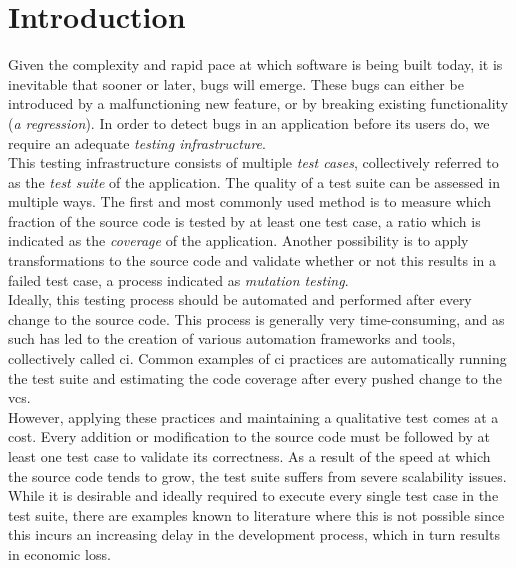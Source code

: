 
\chapter{Introduction}
\label{ch:introduction}
Given the complexity and rapid pace at which software is being built today, it is inevitable that sooner or later, bugs will emerge. These bugs can either be introduced by a malfunctioning new feature, or by breaking existing functionality (\emph{a regression}). In order to detect bugs in an application before its users do, we require an adequate \emph{testing infrastructure}.\\

\noindent This testing infrastructure consists of multiple \emph{test cases}, collectively referred to as the \emph{test suite} of the application. The quality of a test suite can be assessed in multiple ways. The first and most commonly used method is to measure which fraction of the source code is tested by at least one test case, a ratio which is indicated as the \emph{coverage} of the application. Another possibility is to apply transformations to the source code and validate whether or not this results in a failed test case, a process indicated as \emph{mutation testing}.\\

\noindent Ideally, this testing process should be automated and performed after every change to the source code. This process is generally very time-consuming, and as such has led to the creation of various automation frameworks and tools, collectively called \acrfull{ci}. Common examples of \acrshort{ci} practices are automatically running the test suite and estimating the code coverage after every pushed change to the \acrfull{vcs}.\\

\noindent However, applying these practices and maintaining a qualitative test comes at a cost. Every addition or modification to the source code must be followed by at least one test case to validate its correctness. As a result of the speed at which the source code tends to grow, the test suite suffers from severe scalability issues. While it is desirable and ideally required to execute every single test case in the test suite, there are examples known to literature where this is not possible since this incurs an increasing delay in the development process, which in turn results in economic loss.\\

